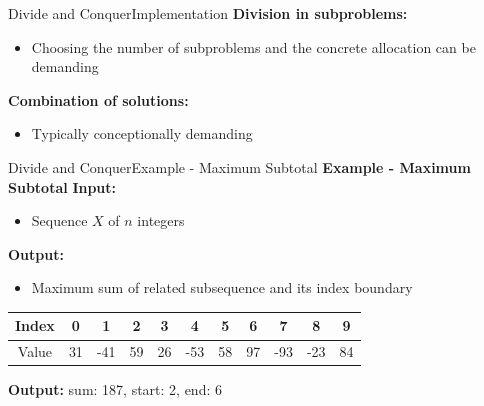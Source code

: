
\begin{frame}{Divide and Conquer}{Implementation}
  \textbf{Division in subproblems:}
  \begin{itemize}
    \item<2->
      Choosing the number of subproblems and the concrete allocation can be
      demanding
  \end{itemize}
  \vspace{1em}
  \textbf{Combination of solutions:}
  \begin{itemize}
    \item<4->
      Typically conceptionally demanding
  \end{itemize}
\end{frame}


\begin{frame}{Divide and Conquer}{Example - Maximum Subtotal}
  \textbf{Example - Maximum Subtotal}
   \textbf{Input:}
  \begin{itemize}
    \item<4->
      Sequence {\color{MainA}$X$} of {\color{MainA}$n$} integers
  \end{itemize}
  \textbf{Output:}
  \begin{itemize}
    \item<6->
      Maximum sum of related subsequence and its index boundary
  \end{itemize}
    \vspace{1em}
    \begin{table}[!t]
      \begin{tabular}{c|c|c|c|c|c|c|c|c|c|c}
        Index & 0 & 1 & 2 & 3 & 4 & 5 & 6 & 7 & 8 & 9\\
        \midrule
        Value & 31 & -41 & 59 & 26 & -53 & 58 & 97 & -93 & -23 & 84
      \end{tabular}
      \end{table}
  \textbf{Output:} sum: 187, start: 2, end: 6
\end{frame}


